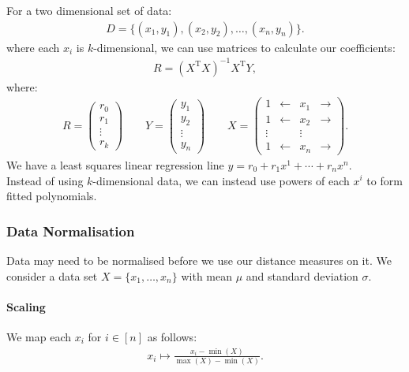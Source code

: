 \noindent
For a two dimensional set of data: 
\begin{gather*}
    D = \{(x_1, y_1), (x_2, y_2), \ldots, (x_n, y_n)\}.
\end{gather*} where each $x_i$ is $k$-dimensional,
we can use matrices to calculate our coefficients: \begin{gather*}
    R = (X^{\text{T}}X)^{-1}X^{\text{T}}Y,
\end{gather*} where: \begin{gather*}
    R = \begin{pmatrix}
        r_0 \\ r_1 \\ \vdots \\ r_k
    \end{pmatrix} 
    \qquad
    Y = \begin{pmatrix}
        y_1 \\ y_2 \\ \vdots \\ y_n
    \end{pmatrix}
    \qquad
    X = \begin{pmatrix}
        1      & \leftarrow & x_1    & \rightarrow \\
        1      & \leftarrow & x_2    & \rightarrow \\
        \vdots &            & \vdots &             \\
        1      & \leftarrow & x_n    & \rightarrow
    \end{pmatrix}.
\end{gather*} We have a least squares linear regression line
$y = r_0 + r_1x^1 + \cdots + r_nx^n$.
\\[\baselineskip]
Instead of using $k$-dimensional data, we can instead use
powers of each $x^i$ to form fitted polynomials.

\subsubsection{Data Normalisation}

Data may need to be normalised before we use our distance measures
on it. We consider a data set $X = \{x_1, \ldots, x_n\}$
with mean $\mu$ and standard deviation $\sigma$.

\paragraph{Scaling} We map each $x_i$ for $i \in [n]$ as follows:
\begin{gather*}
    x_i \mapsto \frac{x_i - \min(X)}{\max(X) - \min(X)}.
\end{gather*}

